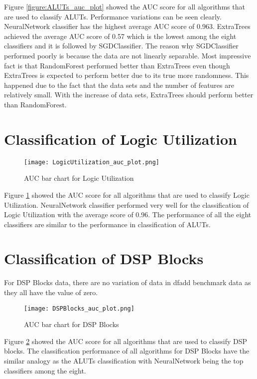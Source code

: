 Figure \ref{figure:ALUTs_auc_plot} showed the AUC score for all algorithms that are used to classify ALUTs. Performance variations can be seen clearly. NeuralNetwork classifier has the highest average AUC score of 0.963. ExtraTrees achieved the average AUC score of 0.57 which is the lowest among the eight classifiers and it is followed by SGDClassifier. The reason why SGDClassifier performed poorly is because the data are not linearly separable. Most impressive fact is that RandomForest performed better than ExtraTrees even though ExtraTrees is expected to perform better due to its true more randomness. This happened due to the fact that the data sets and the number of features are relatively small. With the increase of data sets, ExtraTrees should perform better than RandomForest.

\section{Classification of Logic Utilization}

\begin{figure}[h!]
\centering
\texttt{[image: LogicUtilization\_auc\_plot.png]}
\caption{AUC bar chart for Logic Utilization}
\label{figure:LogicUtilization_auc_plot}
\end{figure}

Figure \ref{figure:LogicUtilization_auc_plot} showed the AUC score for all algorithms that are used to classify Logic Utilization. NeuralNetwork classifier performed very well for the classification of Logic Utilization with the average score of 0.96. The performance of all the eight classifiers are similar to the performance in classification of ALUTs.

\section{Classification of DSP Blocks}

For DSP Blocks data, there are no variation of data in dfadd benchmark data as they all have the value of zero.

\begin{figure}[h!]
\centering
\texttt{[image: DSPBlocks\_auc\_plot.png]}
\caption{AUC bar chart for DSP Blocks}
\label{figure:dsp_auc_plot}
\end{figure}

Figure \ref{figure:dsp_auc_plot} showed the AUC score for all algorithms that are used to classify DSP blocks. The classification performance of all algorithms for DSP Blocks have the similar analogy as the ALUTs classification with NeuralNetwork being the top classifiers among the eight.


